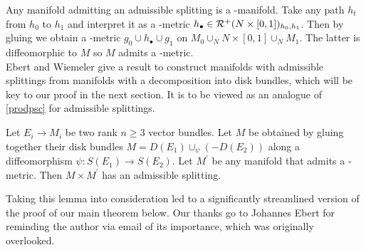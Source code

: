 Any manifold admitting an admissible splitting is a \psc-manifold.
Take any path $h_t$ from $h_0$ to $h_1$ and interpret it as a \psc-metric $h_\bullet\in\mathcal{R}^+(N\times[0,1])_{h_0,h_1}$. 
Then by gluing we obtain a \psc-metric $g_0\cup h_\bullet \cup g_1$ on $M_0\cup_N N\times[0,1]\cup_N M_1$.
The latter is diffeomorphic to $M$ so $M$ admits a \psc-metric.\\
Ebert and Wiemeler give a result to construct manifolds with admissible splittings from manifolds with a decomposition into disk bundles, which will be key to our proof in the next section.
It is to be viewed as an analogue of \ref{prodpsc} for admissible splittings.
\begin{thesislemma}\label{diskbdlsplit}
    Let $E_i \to M_i$ be two rank $n\geq 3$ vector bundles. 
    Let $M$ be obtained by gluing together their disk bundles $M = D(E_1)\cup_\psi (-D(E_2))$ along a diffeomorphism $\psi\colon S(E_1) \to S(E_2)$. 
    Let $M^\prime$ be any manifold that admits a \psc-metric. Then $M\times M^\prime$ has an admissible splitting.
\end{thesislemma}
Taking this lemma into consideration led to a significantly streamlined version of the proof of our main theorem below.
Our thanks go to Johannes Ebert for reminding the author via email of its importance, which was originally overlooked.

